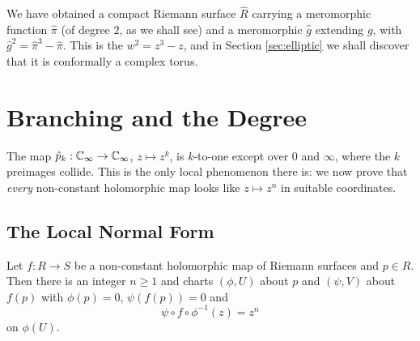 \documentclass[a4paper]{scrartcl}
\newcommand{\Cinf}{\C_\infty}
\begin{document}
We have obtained a compact Riemann surface $\hat R$ carrying a meromorphic function
$\hat\pi$ (of degree $2$, as we shall see) and a meromorphic $\hat g$ extending $g$, with
$\hat g^2 = \hat\pi^3 - \hat\pi$. This is the  $w^2 = z^3 - z$, and
in Section \ref{sec:elliptic} we shall discover that it is conformally a complex torus.

\section{Branching and the Degree}\label{sec:branching}

The map $\hat p_k : \Cinf \to \Cinf$, $z \mapsto z^k$, is $k$-to-one except over $0$ and
$\infty$, where the $k$ preimages collide. This is the only local phenomenon there is: we
now prove that \emph{every} non-constant holomorphic map looks like $z \mapsto z^n$ in
suitable coordinates.

\subsection{The Local Normal Form}

\begin{proposition}\label{prop:localform}
	Let $f : R \to S$ be a non-constant holomorphic map of Riemann surfaces and $p \in R$.
	Then there is an integer $n \geq 1$ and charts $(\phi, U)$ about $p$ and $(\psi, V)$
	about $f(p)$ with $\phi(p) = 0$, $\psi(f(p)) = 0$ and
	$$
	\psi \circ f \circ \phi^{-1}(z) = z^n
	$$
	on $\phi(U)$.
\end{proposition}
\end{document}
